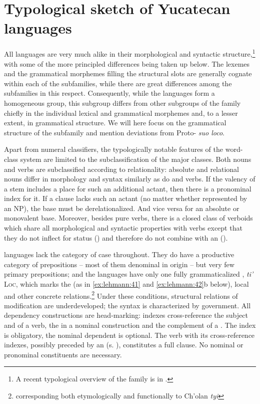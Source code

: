 \documentclass[output=paper]{langsci/langscibook}
\begin{document}
\section{Typological sketch of Yucatecan languages}\label{sec:lehmann:3}
All  languages are very much alike in their morphological and syntactic structure,\footnote{A recent typological overview of the  family is in  \citet{GrinevaldPeake2012}.} with some of the more principled differences being taken up below. The lexemes and the grammatical morphemes filling the structural slots are generally cognate within each of the subfamilies, while there are great differences among the subfamilies in this respect. Con\-sequently, while the  languages form a homogeneous group, this subgroup differs from other subgroups of the  family chiefly in the individual lexical and grammatical morphemes and, to a lesser extent, in grammatical structure. We will here focus on the grammatical structure of the  subfamily and mention deviations from Proto- \textit{suo loco}.



Apart from numeral classifiers, the typologically notable features of the word-class system are limited to the subclassification of the major classes. Both nouns and verbs are subclassified according to relationality: absolute and relational nouns differ in morphology and syntax similarly as do  and  verbs. If the %
valency of a stem includes a place for such an additional actant, then there is a pronominal index for it. If a clause lacks such an actant (no matter whether represented by an NP), the base must be derelationalized. And vice versa for an absolute or monovalent base. Moreover, besides pure verbs, there is a closed class of verboids which share all morphological and syntactic properties with verbs except that they do not inflect for status () and therefore do not combine with an  ().



 languages lack the category of case throughout. They do have a productive category of prepositions – most of them denominal in origin – but very few primary prepositions; and the  languages have only one fully grammaticalized , \textit{ti’} \textsc{Loc}, which marks the  (as in \ref{ex:lehmann:41} and \ref{ex:lehmann:42}b below), local and other concrete relations.\footnote{corresponding both etymologically and functionally to Ch'olan \textit{tyi}} Under these conditions, structural relations of modification are underdeveloped; the syntax is characterized by government. All dependency constructions are head-marking: indexes cross-reference the subject and  of a verb, the  in a nominal construction and the complement of a . The index is obligatory, the nominal dependent is optional. The verb with its cross-reference indexes, possibly preceded by an  (s. ), constitutes a full clause. No nominal or pronominal constituents are necessary.
\end{document}
